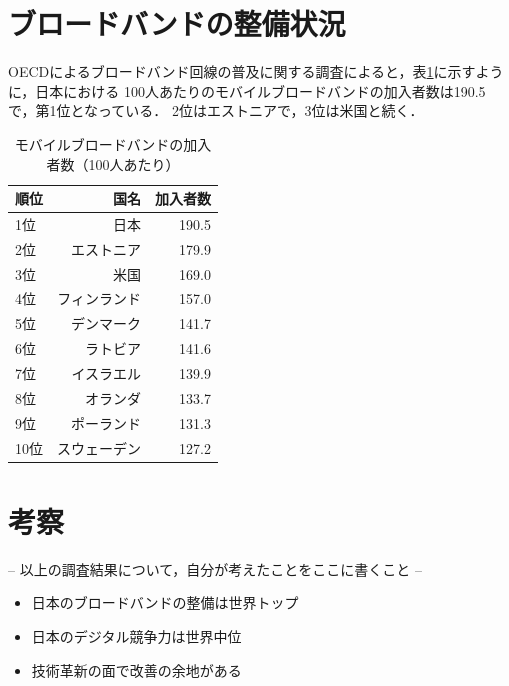 \documentclass[a4paper,11pt,dvipdfmx]{ujarticle}
\begin{document}
\section{ブロードバンドの整備状況}
OECDによるブロードバンド回線の普及に関する調査\cite{oecd}によると，表\ref{tbl:加入率}に示すように，日本における
100人あたりのモバイルブロードバンドの加入者数は190.5で，第1位となっている．
2位はエストニアで，3位は米国と続く．
\begin{table}[htbp]
    \centering
    \caption{モバイルブロードバンドの加入者数（100人あたり）}
    \label{tbl:加入率}

    \begin{tabular}{|l|r|r|}\hline
        順位 & 国名 & 加入者数 \\
        \hline
        1位 & 日本 & 190.5 \\
        \hline
        2位 & エストニア & 179.9 \\
        \hline
        3位 & 米国 & 169.0 \\
        \hline
        4位 & フィンランド & 157.0 \\
        \hline
        5位 & デンマーク & 141.7 \\
        \hline
       6位 & ラトビア & 141.6 \\
        \hline 
       7位 & イスラエル & 139.9 \\
        \hline
       8位 & オランダ & 133.7 \\
        \hline
       9位 & ポーランド & 131.3 \\
        \hline
       10位 & スウェーデン & 127.2 \\
        \hline  
    \end{tabular}
\end{table}
%
\section{考察}
-- 以上の調査結果について，自分が考えたことをここに書くこと --

\begin{itemize}
    \item 日本のブロードバンドの整備は世界トップ
    \item 日本のデジタル競争力は世界中位
    \item 技術革新の面で改善の余地がある
\end{itemize}
%



\end{document}
